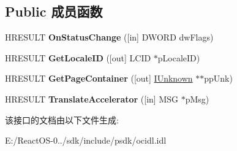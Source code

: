\subsection*{Public 成员函数}
\begin{DoxyCompactItemize}
\item 
\mbox{\label{interface_i_property_page_site_a2a0fc4d6b6d3af4c2fdb785060a7f33e}} 
H\+R\+E\+S\+U\+LT {\bfseries On\+Status\+Change} (\mbox{[}in\mbox{]} D\+W\+O\+RD dw\+Flags)
\item 
\mbox{\label{interface_i_property_page_site_ae0632fa8c5224dfe99c3cf99124b16d1}} 
H\+R\+E\+S\+U\+LT {\bfseries Get\+Locale\+ID} (\mbox{[}out\mbox{]} L\+C\+ID $\ast$p\+Locale\+ID)
\item 
\mbox{\label{interface_i_property_page_site_a17004c18ed205eda408b8fde64f4f053}} 
H\+R\+E\+S\+U\+LT {\bfseries Get\+Page\+Container} (\mbox{[}out\mbox{]} \hyperlink{interface_i_unknown}{I\+Unknown} $\ast$$\ast$pp\+Unk)
\item 
\mbox{\label{interface_i_property_page_site_a7e7fde8b26551af2076e35e69ad2367f}} 
H\+R\+E\+S\+U\+LT {\bfseries Translate\+Accelerator} (\mbox{[}in\mbox{]} M\+SG $\ast$p\+Msg)
\end{DoxyCompactItemize}


该接口的文档由以下文件生成\+:\begin{DoxyCompactItemize}
\item 
E\+:/\+React\+O\+S-\/0../sdk/include/psdk/ocidl.\+idl\end{DoxyCompactItemize}
